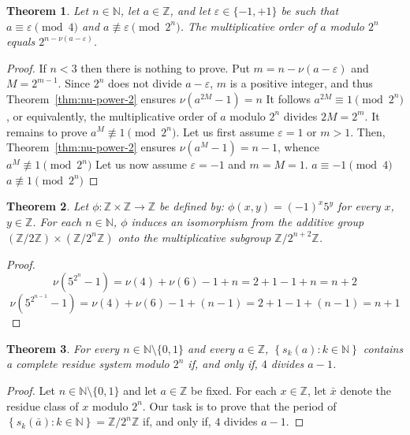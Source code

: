 \documentclass[12pt]{article}
\newcommand{\bZ}{\mathbb{Z}}
\newcommand{\bN}{\mathbb{N}} %
\newtheorem{theorem}{Theorem}
\theoremstyle{definition}
\begin{document}
  \begin{theorem}
    Let $n \in \bN$, let $a \in \bZ$, and let $\varepsilon \in \{ -1, + 1 \}$ be such that
    $a \equiv \varepsilon \pmod 4$ and
    $a \not \equiv \varepsilon \pmod{2^n}$.
    The multiplicative order of $a$ modulo $2^n$ equals $2^{n - \nu(a - \varepsilon)}$.
  \end{theorem}
  
  \begin{proof}
    If $n < 3$ then there is nothing to prove.
    Put $m = n - \nu(a - \varepsilon)$ and $M = 2^{m - 1}$.
    Since $2^n$ does not divide $a - \varepsilon$,
    $m$ is a positive integer, and thus
    Theorem~\ref{thm:nu-power-2} ensures $\nu(a^{2M} - 1) = n$
    It follows $a^{2M} \equiv 1 \pmod{2^n}$, or equivalently, 
    the multiplicative order of $a$ modulo $2^n$ divides $2M = 2^m$.
    It remains to prove $a^M \not \equiv 1 \pmod{2^n}$.
    Let us first assume $\varepsilon = 1$ or $m > 1$.
    Then, Theorem~\ref{thm:nu-power-2} ensures $\nu(a^M - 1) = n - 1$, whence $a^M \not \equiv 1 \pmod{2^n}$
    Let us now assume $\varepsilon = - 1$ and $m = M = 1$.
     $a \equiv - 1 \pmod 4$
    $a \not \equiv 1 \pmod{2^n}$   
    
  \end{proof}

 \begin{theorem}
   Let $\phi\colon \bZ \times \bZ \to \bZ$ be defined by:
   $\phi(x, y) = {(- 1)}^x 5^y$ for every $x$, $y \in \bZ$.
   For each $n \in \bN$, $\phi$ induces an isomorphism
   from the additive group $(\bZ / 2  \bZ) \times (\bZ / 2^n \bZ)$
   onto
   the multiplicative subgroup $\bZ / 2^{n + 2} \bZ$.
 \end{theorem}

 \begin{proof}
   $$
   \nu(5^{2^{n}} - 1) = \nu(4) + \nu(6) - 1  + n  = 2 + 1 - 1 + n = n + 2
   $$
   $$
   \nu(5^{2^{n - 1}} - 1) = \nu(4) + \nu(6) - 1  + (n - 1)  = 2 + 1 - 1 + (n - 1) = n + 1
   $$
 \end{proof}



  
 \begin{theorem}
   For every $n \in \bN \setminus \{ 0, 1 \}$ and every $a \in \bZ$,
   $\left\{  s_k(a) : k \in \bN \right\}$ contains a complete residue system modulo $2^n$  if, and only if,
   $4$ divides $a - 1$.
 \end{theorem}

 \begin{proof}
   Let $n \in \bN \setminus \{ 0, 1 \}$ and let $a \in \bZ$ be fixed.
   For each $x \in \bZ$, let $\bar x$ denote the residue class of $x$ modulo $2^n$.
   Our task is to prove that the period of $\left\{  s_k(\bar a) : k \in \bN \right\} = \bZ / 2^n \bZ$
   if, and only if, $4$ divides $a - 1$.    
   
 \end{proof}
 
\end{document}
